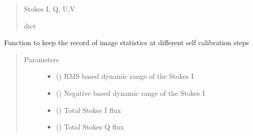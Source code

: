 \documentclass[letterpaper,10pt,english]{sphinxmanual}
\begin{document}
\begin{fulllineitems}
\begin{fulllineitems}
\begin{quote}
\begin{description}
\begin{itemize}
\end{itemize}

\item[{Returns}] \leavevmode
\sphinxAtStartPar
Stokes I, Q, U,V

\item[{Return type}] \leavevmode
\sphinxAtStartPar
dict

\end{description}\end{quote}

\end{fulllineitems}


\begin{fulllineitems}
\label{\detokenize{paircars:paircars.fullpol_selfcal_LTS.PolSelfcal.IMSTAT_record}}
\sphinxAtStartPar
Function to keep the record of image statistics at different self calibration steps
\begin{quote}\begin{description}
\item[{Parameters}] \leavevmode\begin{itemize}
\item {} 
\sphinxAtStartPar
{} () \textendash{} RMS based dynamic range of the Stokes I

\item {} 
\sphinxAtStartPar
{} () \textendash{} Negative based dynamic range of the Stokes I

\item {} 
\sphinxAtStartPar
{} () \textendash{} Total Stokes I flux

\item {} 
\sphinxAtStartPar
{} () \textendash{} Total Stokes Q flux


\end{itemize}
\end{description}
\end{quote}
\end{fulllineitems}
\end{fulllineitems}
\end{document}

